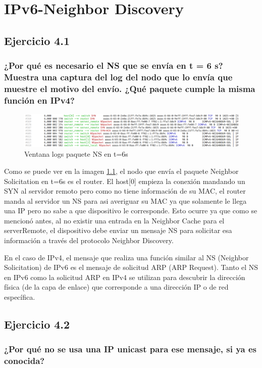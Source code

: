 \chapter{IPv6-Neighbor Discovery}
\label{chap:ipv6_nd}

\section{Ejercicio 4.1}
\subsection{¿Por qué es necesario el NS que se envía en t = 6 s? Muestra una captura del log del nodo que lo envía que muestre el motivo del envío. ¿Qué paquete cumple la misma función en IPv4?}

\begin{figure}[H]
    \centering   
    \includegraphics[width=135mm, scale=0.75]{imaxes/captura_ejer4_1.png}
    \caption{Ventana logs paquete NS en t=6s}
    \label{fig:logs_ns_t6}
\end{figure}

Como se puede ver en la imagen \ref{fig:logs_ns_t6}, el nodo que envía el paquete Neighbor Solicitation en t=6s es el router. El host[0] empieza la conexión mandando un SYN al servidor remoto pero como no tiene información de su MAC, el router manda al servidor un NS para asi averiguar su MAC ya que solamente le llega una IP pero no sabe a que dispositivo le corresponde. Esto ocurre ya que como se mencionó antes, al no existir una entrada en la Neighbor Cache para el serverRemote, el dispositivo debe enviar un mensaje NS para solicitar esa información a través del protocolo Neighbor Discovery.

En el caso de IPv4, el mensaje que realiza una función similar al NS (Neighbor Solicitation) de IPv6 es el mensaje de solicitud ARP (ARP Request). Tanto el NS en IPv6 como la solicitud ARP en IPv4 se utilizan para descubrir la dirección física (de la capa de enlace) que corresponde a una dirección IP o de red específica.

\section{Ejercicio 4.2}
\subsection{¿Por qué no se usa una IP unicast para ese mensaje, si ya es conocida?}

